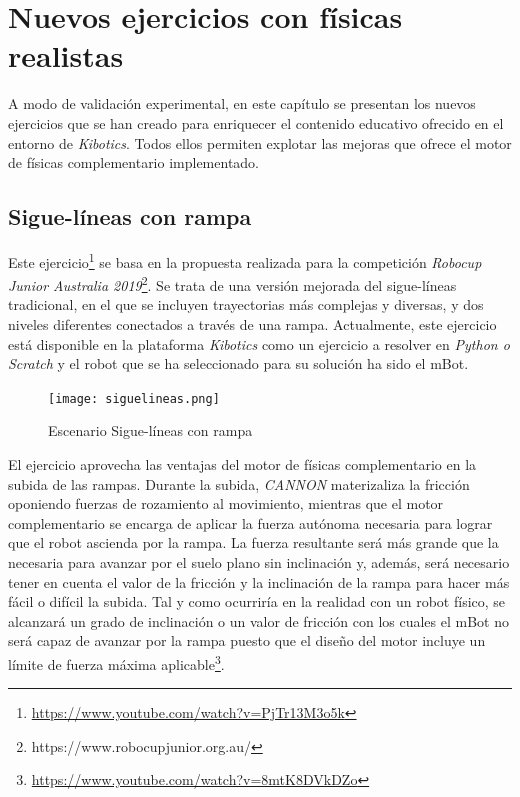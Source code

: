 \chapter{Nuevos ejercicios con físicas realistas}
\label{chap:nuevos_ejercicios} 
A modo de validación experimental, en este capítulo se presentan los nuevos ejercicios que se han creado para enriquecer el contenido educativo ofrecido en el entorno de \textit{Kibotics}. Todos ellos permiten explotar las mejoras que ofrece el motor de físicas complementario implementado.

\section{Sigue-líneas con rampa}
Este ejercicio\footnote{\url{https://www.youtube.com/watch?v=PjTr13M3o5k}} se basa en la propuesta realizada para la competición \textit{Robocup Junior Australia 2019}\footnote{https://www.robocupjunior.org.au/}. Se trata de una versión mejorada del sigue-líneas tradicional, en el que se incluyen trayectorias más complejas y diversas, y dos niveles diferentes conectados a través de una rampa. Actualmente, este ejercicio está disponible en la plataforma \textit{Kibotics} como un ejercicio a resolver en \textit{Python o Scratch} y el robot que se ha seleccionado para su solución ha sido el mBot.  

\newpage

\begin{figure}[h!]
    \centering
    \texttt{[image: siguelineas.png]}
    \caption{Escenario Sigue-líneas con rampa}
    \label{fig:Sigue-líneas con rampa 2}
\end{figure}

El ejercicio  aprovecha las ventajas del motor de físicas complementario en la subida de las rampas. Durante la subida, \textit{CANNON} materizaliza la fricción oponiendo fuerzas de rozamiento al movimiento, mientras que el motor complementario se encarga de aplicar la fuerza autónoma necesaria para lograr que el robot ascienda por la rampa. La fuerza resultante será más grande que la necesaria para avanzar por el suelo plano sin inclinación y, además, será necesario tener en cuenta el valor de la fricción y la inclinación de la rampa para hacer más fácil o difícil la subida. Tal y como ocurriría en la realidad con un robot físico, se alcanzará un grado de inclinación o un valor de fricción con los cuales el mBot no será capaz de avanzar por la rampa puesto que el diseño del motor incluye un límite de fuerza máxima aplicable\footnote{\url{https://www.youtube.com/watch?v=8mtK8DVkDZo}}.



